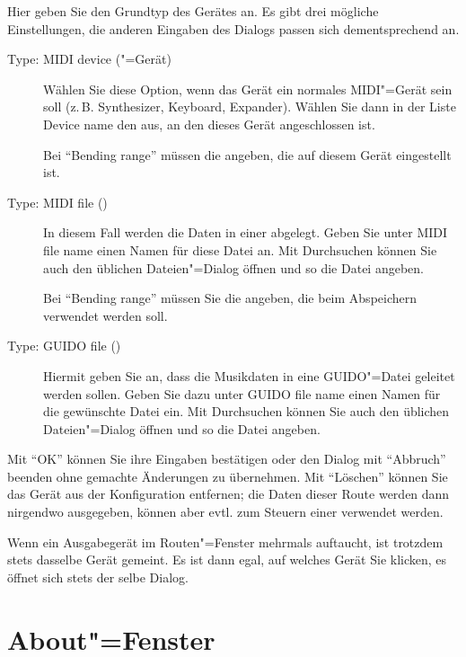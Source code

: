 Hier geben Sie den Grundtyp des Gerätes an. Es gibt drei mögliche 
Einstellungen, die anderen Eingaben des Dialogs passen sich dementsprechend 
an.

\begin{description}
\item[Type: MIDI device ("=Gerät)] Wählen
  Sie diese Option, wenn das Gerät ein normales MIDI"=Gerät sein soll
  (z.\,B. Synthesizer, Keyboard, Expander). Wählen Sie dann in der Liste
  Device name den  aus, an den dieses
  Gerät angeschlossen ist.

  Bei "`Bending range"' müssen die  angeben, die auf diesem Gerät eingestellt ist.

\item[Type: MIDI file ()] In
  diesem Fall werden die Daten in einer
   abgelegt. Geben Sie unter
  MIDI file name einen Namen für diese Datei an. Mit Durchsuchen
  können Sie auch den üblichen Dateien"=Dialog öffnen und so die Datei
  angeben.

  Bei "`Bending range"' müssen Sie die
   angeben, die beim
  Abspeichern verwendet werden soll.

\item[Type: GUIDO file ()] Hiermit
  geben Sie an, dass die Musikdaten in eine GUIDO"=Datei geleitet
  werden sollen. Geben Sie dazu unter GUIDO file name einen Namen für
  die gewünschte Datei ein. Mit Durchsuchen können Sie auch den
  üblichen Dateien"=Dialog öffnen und so die Datei angeben.
\end{description}

Mit "`OK"' können Sie ihre Eingaben bestätigen oder den Dialog 
mit "`Abbruch"' beenden ohne gemachte Änderungen zu übernehmen. 
Mit "`Löschen"' können Sie das Gerät aus der Konfiguration 
entfernen; die Daten dieser Route werden dann nirgendwo ausgegeben, 
können aber evtl. zum Steuern einer  verwendet 
werden.

Wenn ein Ausgabegerät im Routen"=Fenster mehrmals auftaucht, 
ist trotzdem stets dasselbe Gerät gemeint. Es ist dann egal, 
auf welches Gerät Sie klicken, es öffnet sich stets der selbe 
Dialog.

\section{About"=Fenster}\label{sec:DE_ABOUT}

